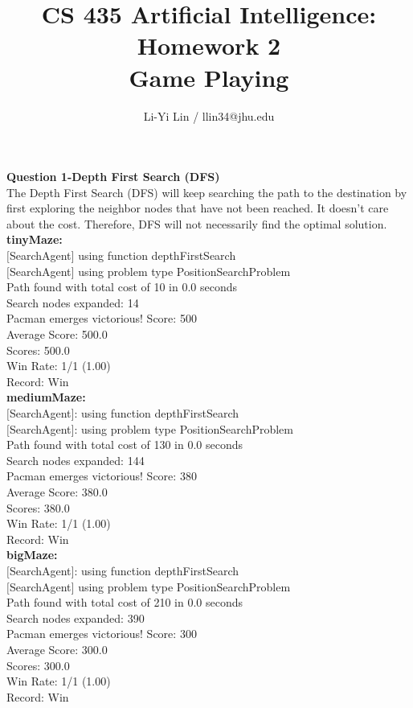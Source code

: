 \documentclass[11pt]{article}
\title{CS 435 Artificial Intelligence: Homework 2\\Game Playing\\}
\author{Li-Yi Lin / llin34@jhu.edu}
\begin{document}
\maketitle
\noindent
\textbf{Question 1-Depth First Search (DFS)}\\
The Depth First Search (DFS) will keep searching the path to the destination by first exploring the neighbor nodes that have not been reached. It doesn't care about the cost. Therefore, DFS will not necessarily find the optimal solution. \\

\noindent
\textbf{tinyMaze: }\\
$[$SearchAgent$]$ using function depthFirstSearch\\
$[$SearchAgent$]$ using problem type PositionSearchProblem\\
Path found with total cost of 10 in 0.0 seconds\\
Search nodes expanded: 14\\
Pacman emerges victorious! Score: 500\\
Average Score: 500.0\\
Scores:        500.0\\
Win Rate:      1/1 (1.00)\\
Record:        Win\\

\noindent
\textbf{mediumMaze:}\\
$[$SearchAgent$]$: using function depthFirstSearch\\
$[$SearchAgent$]$: using problem type PositionSearchProblem\\
Path found with total cost of 130 in 0.0 seconds\\
Search nodes expanded: 144\\
Pacman emerges victorious! Score: 380\\
Average Score: 380.0\\
Scores:        380.0\\
Win Rate:      1/1 (1.00)\\
Record:        Win\\

\noindent
\textbf{bigMaze:}\\
$[$SearchAgent$]$: using function depthFirstSearch\\
$[$SearchAgent$]$ using problem type PositionSearchProblem\\
Path found with total cost of 210 in 0.0 seconds\\
Search nodes expanded: 390\\
Pacman emerges victorious! Score: 300\\
Average Score: 300.0\\
Scores:        300.0\\
Win Rate:      1/1 (1.00)\\
Record:        Win\\
\end{document}
